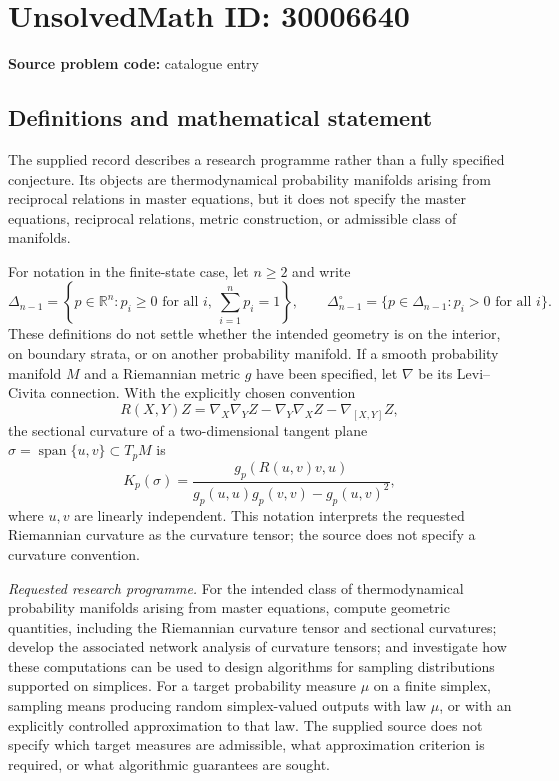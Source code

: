 \documentclass[11pt]{article}
\newcommand{\R}{\mathbb{R}}
\begin{document}
\section*{UnsolvedMath ID: 30006640}
\textbf{Source problem code:} catalogue entry
\subsection{Definitions and mathematical statement}
The supplied record describes a research programme rather than a fully specified conjecture. Its objects are thermodynamical probability manifolds arising from reciprocal relations in master equations, but it does not specify the master equations, reciprocal relations, metric construction, or admissible class of manifolds.

For notation in the finite-state case, let \(n\geq 2\) and write
\[
\Delta_{n-1}=\left\{p\in\R^n:p_i\geq0\text{ for all }i,\ \sum_{i=1}^n p_i=1\right\},\qquad
\Delta_{n-1}^{\circ}=\{p\in\Delta_{n-1}:p_i>0\text{ for all }i\}.
\]
These definitions do not settle whether the intended geometry is on the interior, on boundary strata, or on another probability manifold. If a smooth probability manifold \(M\) and a Riemannian metric \(g\) have been specified, let \(\nabla\) be its Levi--Civita connection. With the explicitly chosen convention
\[
R(X,Y)Z=\nabla_X\nabla_YZ-\nabla_Y\nabla_XZ-\nabla_{[X,Y]}Z,
\]
the sectional curvature of a two-dimensional tangent plane \(\sigma=\operatorname{span}\{u,v\}\subset T_pM\) is
\[
K_p(\sigma)=\frac{g_p(R(u,v)v,u)}{g_p(u,u)g_p(v,v)-g_p(u,v)^2},
\]
where \(u,v\) are linearly independent. This notation interprets the requested Riemannian curvature as the curvature tensor; the source does not specify a curvature convention.

\emph{Requested research programme.} For the intended class of thermodynamical probability manifolds arising from master equations, compute geometric quantities, including the Riemannian curvature tensor and sectional curvatures; develop the associated network analysis of curvature tensors; and investigate how these computations can be used to design algorithms for sampling distributions supported on simplices. For a target probability measure \(\mu\) on a finite simplex, sampling means producing random simplex-valued outputs with law \(\mu\), or with an explicitly controlled approximation to that law. The supplied source does not specify which target measures are admissible, what approximation criterion is required, or what algorithmic guarantees are sought.
\end{document}
